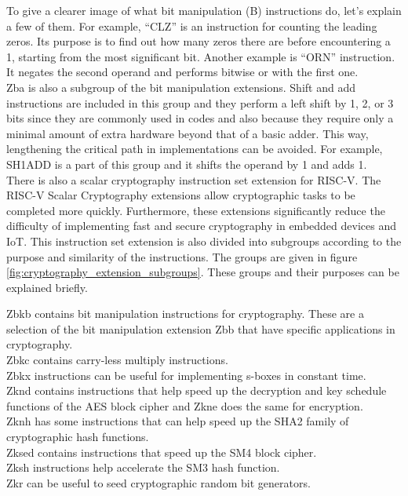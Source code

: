 To give a clearer image of what bit manipulation (B) instructions do, let’s explain a few of them. For example, “CLZ” is an instruction for counting the leading zeros. Its purpose is to find out how many zeros there are before encountering a 1, starting from the most significant bit. Another example is “ORN” instruction. It negates the second operand and performs bitwise or with the first one. \\
Zba is also a subgroup of the bit manipulation extensions. Shift and add instructions are included in this group and they perform a left shift by 1, 2, or 3 bits since they are commonly used in codes and also because they require only a minimal amount of extra hardware beyond that of a basic adder. This way, lengthening the critical path in implementations can be avoided. For example, SH1ADD is a part of this group and it shifts the operand by 1 and adds 1.\cite{bitmanipulationisaextensions}\\
There is also a scalar cryptography instruction set extension for RISC-V. The RISC-V Scalar Cryptography extensions allow cryptographic tasks to be completed more quickly. Furthermore, these extensions significantly reduce the difficulty of implementing fast and secure cryptography in embedded devices and IoT. \cite{cryptogroups} This instruction set extension is also divided into subgroups according to the purpose and similarity of the instructions. The groups are given in figure \ref{fig:cryptography_extension_subgroups}. These groups and their purposes can be explained briefly.

Zbkb contains bit manipulation instructions for cryptography. These are a selection of the bit manipulation extension Zbb that have specific applications in cryptography. \\
Zbkc contains carry-less multiply instructions.\\
Zbkx instructions can be useful for implementing s-boxes in constant time.\\
Zknd contains instructions that help speed up the decryption and key schedule functions of the AES block cipher and Zkne does the same for encryption.\\
Zknh has some instructions that can help speed up the SHA2 family of cryptographic hash functions.\\
Zksed contains instructions that speed up the SM4 block cipher.\\
Zksh instructions help accelerate the SM3 hash function.\\
Zkr can be useful to seed cryptographic random bit generators.\cite{cryptoextensiondoc}

